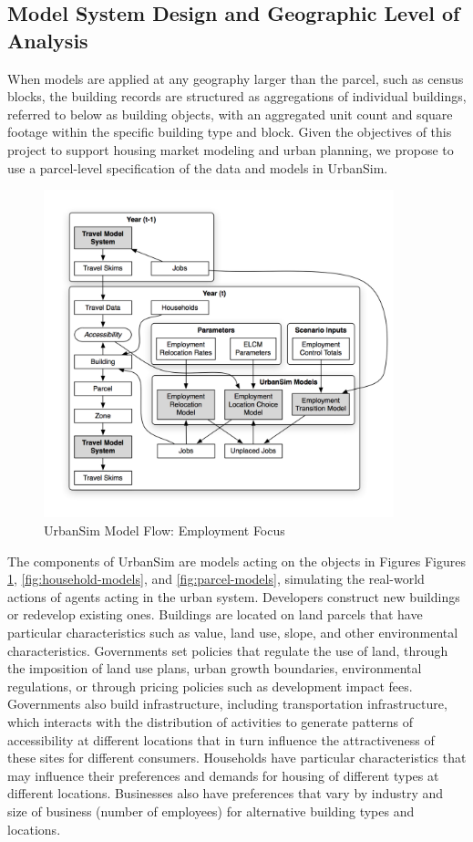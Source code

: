 \subsection{Model System Design and Geographic Level of Analysis}



When models are applied at any geography larger than the parcel, such as census blocks, the building records are structured as aggregations of individual buildings, referred to below as building objects, with an aggregated unit count and square footage within the specific building type and block. Given the objectives of this project to support housing market modeling and urban planning, we propose to use a parcel-level specification of the data and models in UrbanSim.  



\begin{figure}[h]
\center
 \includegraphics[width=4in]{graphics/ParcelEmploymentModel.png}
\caption{UrbanSim Model Flow: Employment Focus}
\label{fig:employment-models}
\end{figure}

The components of UrbanSim are models acting on the objects in Figures Figures \ref{fig:employment-models}, \ref{fig:household-models}, and \ref{fig:parcel-models}, simulating the real-world actions of agents acting in the urban system.  Developers construct new buildings or redevelop existing ones.  Buildings are located on land parcels that have particular characteristics such as value, land use, slope, and other environmental characteristics.  Governments set policies that regulate the use of land, through the imposition of land use plans, urban growth boundaries, environmental regulations, or through pricing policies such as development impact fees.  Governments also build infrastructure, including transportation infrastructure, which interacts with the distribution of activities to generate patterns of accessibility at different locations that in turn influence the attractiveness of these sites for different consumers.  Households have particular characteristics that may influence their preferences and demands for housing of different types at different locations.  Businesses also have preferences that vary by industry and size of business (number of employees) for alternative building types and locations.



